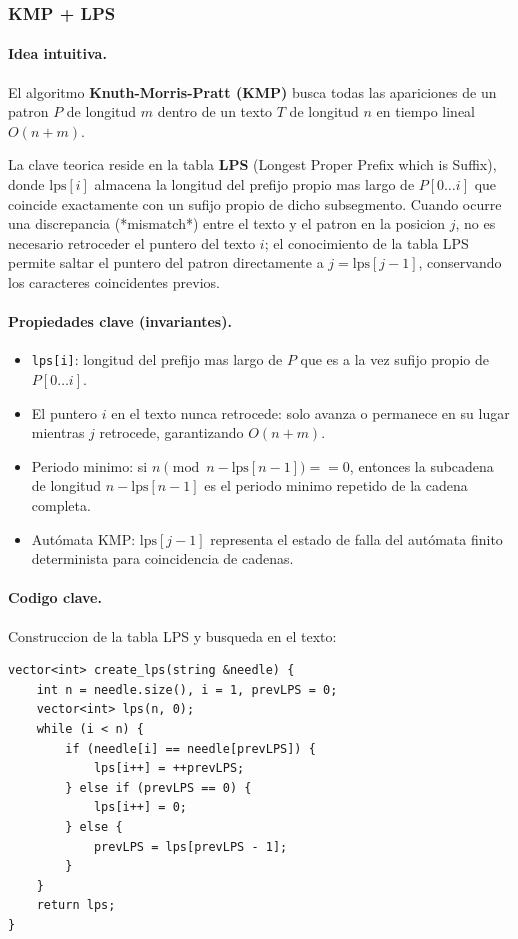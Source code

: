 \subsubsection{KMP + LPS}

\paragraph{Idea intuitiva.}
El algoritmo \textbf{Knuth-Morris-Pratt (KMP)} busca todas las apariciones de un patron $P$ de longitud $m$ dentro de un texto $T$ de longitud $n$ en tiempo lineal $O(n + m)$. 

La clave teorica reside en la tabla \textbf{LPS} (Longest Proper Prefix which is Suffix), donde $\text{lps}[i]$ almacena la longitud del prefijo propio mas largo de $P[0 \dots i]$ que coincide exactamente con un sufijo propio de dicho subsegmento. Cuando ocurre una discrepancia (*mismatch*) entre el texto y el patron en la posicion $j$, no es necesario retroceder el puntero del texto $i$; el conocimiento de la tabla LPS permite saltar el puntero del patron directamente a $j = \text{lps}[j-1]$, conservando los caracteres coincidentes previos.

\paragraph{Propiedades clave (invariantes).}
\begin{itemize}\setlength\itemsep{0pt}
	\item \texttt{lps[i]}: longitud del prefijo mas largo de $P$ que es a la vez sufijo propio de $P[0 \dots i]$.
	\item El puntero $i$ en el texto nunca retrocede: solo avanza o permanece en su lugar mientras $j$ retrocede, garantizando $O(n + m)$.
	\item Periodo minimo: si $n \pmod{n - \text{lps}[n-1]} == 0$, entonces la subcadena de longitud $n - \text{lps}[n-1]$ es el periodo minimo repetido de la cadena completa.
	\item Autómata KMP: $\text{lps}[j-1]$ representa el estado de falla del autómata finito determinista para coincidencia de cadenas.
\end{itemize}

\paragraph{Codigo clave.}
Construccion de la tabla LPS y busqueda en el texto:
\begin{verbatim}
vector<int> create_lps(string &needle) {
    int n = needle.size(), i = 1, prevLPS = 0;
    vector<int> lps(n, 0);
    while (i < n) {
        if (needle[i] == needle[prevLPS]) {
            lps[i++] = ++prevLPS;
        } else if (prevLPS == 0) {
            lps[i++] = 0;
        } else {
            prevLPS = lps[prevLPS - 1];
        }
    }
    return lps;
}
\end{verbatim}


